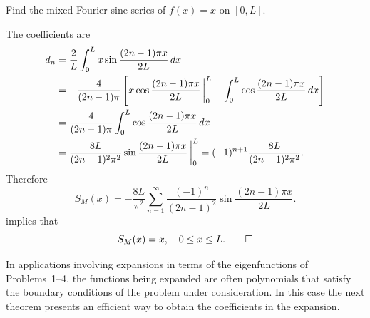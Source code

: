 \begin{example}\label{example:11.3.4}
Find the mixed Fourier sine series of $f(x)=x$ on $[0,L]$.
\end{example}

\begin{solution}
 The coefficients are
\begin{align*}
d_n&=\frac{2}{L}\int_0^Lx\sin\frac{(2n-1)\pi x}{2L}\,dx\\
&=-\frac{4}{(2n-1)\pi}\left[x\cos\frac{(2n-1)\pi x}{2L}\,\bigg|_{0}^{L}-
\int_0^L
\cos\frac{(2n-1)\pi x}{2L}\,dx\right]\\
&=\frac{4}{(2n-1)\pi}
\int_0^L
\cos\frac{(2n-1)\pi x}{2L}\,dx\\
&=\frac{8L}{(2n-1)^2\pi^2}\sin\frac{(2n-1)\pi x}{2L}\,\bigg|_{0}^{L}=(-1)^{n+1}\frac{8L}{(2n-1)^2\pi^2}.
\end{align*}
Therefore
\[
S_M(x)=-\frac{8L}{\pi^2}\sum_{n=1}^\infty\frac{(-1)^n}{(2n-1)^2}
\sin\frac{(2n-1)\pi x}{2L}.
\]
 implies that
\[
S_M(x)=x,\quad 0\le x\le L.\qedhere
\]
\end{solution}



In applications involving expansions in
terms of the eigenfunctions of Problems~1--4, the functions being
expanded
 are often  polynomials that  satisfy the boundary conditions
of the problem under consideration. In this case the next theorem
presents an
 efficient way  to obtain the
coefficients in the expansion.

